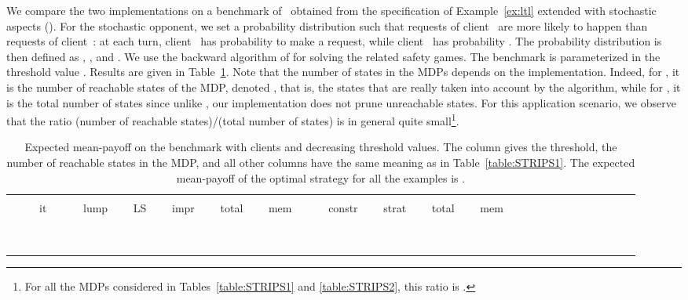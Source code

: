 \medskip
We compare the two implementations on a benchmark of~\cite{DBLP:conf/tacas/BohyBFR13} obtained from the  specification of Example~\ref{ex:ltl} extended with stochastic aspects (). For the stochastic opponent, we set a probability distribution such that requests of client~ are more likely to happen than requests of client~: at each turn, client~ has probability  to make a request, while client~ has probability . The probability distribution  is then defined as , ,  and . We use the backward algorithm of  for solving the related safety games. The benchmark is parameterized in the threshold value . Results are given in Table~\ref{table:LTL}. Note that the number of states in the MDPs depends on the implementation. Indeed, for , it is the number of reachable states of the MDP, denoted , that is, the states that are really taken into account by the algorithm, while for , it is the total number of states since unlike , our implementation does not prune unreachable states. For this application scenario, we observe that the ratio (number of reachable states)/(total number of states) is in general quite small\footnote{For all the MDPs considered in Tables~\ref{table:STRIPS1} and \ref{table:STRIPS2}, this ratio is .}. 

\begin{table}[h!]
	\caption{Expected mean-payoff on the  benchmark with  clients and decreasing threshold values. The column  gives the threshold,  the number of reachable states in the MDP, and all other columns have the same meaning as in Table~\ref{table:STRIPS1}. The expected mean-payoff  of the optimal strategy  for all the examples is .}	\label{table:LTL}
	\centering
	\scriptsize
 	\begin{tabular}{|r||r|r|r|r|r|r|r|r||r|r|r|r|r|r|r|r|r|r|r|r|r|r|r|r|}
		\hline
	  	& \multicolumn{8}{|c||}{{\small }} & \multicolumn{5}{|c|}{{\small }}\rule[-2pt]{0pt}{10pt}\\
		 &   & \ it \  &  & \ lump  \ &  \ LS \  &  \ impr  \ & \  total \  & \ mem \ &  & \ constr \  & \ strat \  & \ total \ & \ mem\ \rule[-3pt]{0pt}{10pt}\\
\hline  &  &  &  &  &  &   &  &  &  &  &   &  & \rule[-3pt]{0pt}{10pt}\\
 &  &  &  &  &  &   &  &  &  &  &   &  & \rule[-3pt]{0pt}{10pt}\\
 &  &  &  &  &  &   &  &  &  &  &   &  & \rule[-3pt]{0pt}{10pt}\\
 &  &  &  &  &  &   &  &  &  &  &   &  & \rule[-3pt]{0pt}{10pt}\\
 &  &  &  &  &  &   &  &  &  &  &   &  & \rule[-3pt]{0pt}{10pt}\\
 &  &  &  &  &  &   &  &  &  &  &   &  & \rule[-3pt]{0pt}{10pt}\\
 &  &  &  &  &  &   &  &  &  &  &   &  & \rule[-3pt]{0pt}{10pt}\\
 &  &  &  &  &  &   &  &  &  &  &   &  & \rule[-3pt]{0pt}{10pt}\\
 &  &  &  &  &  &   &  &  &  &  &   &  & \rule[-3pt]{0pt}{10pt}\\
\hline
	\end{tabular}
	\normalsize
\end{table}


